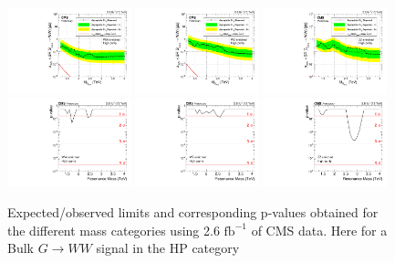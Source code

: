 \begin{figure}[h!]
\centering
\includegraphics[width=0.32\textwidth]{figures/analysis/search1/AN-15-211/limits/brazilianFlag_BulkWW_WWHP_13TeV_wPDF.pdf}
\includegraphics[width=0.32\textwidth]{figures/analysis/search1/AN-15-211/limits/brazilianFlag_BulkWW_WZHP_13TeV_wPDF.pdf}
\includegraphics[width=0.32\textwidth]{figures/analysis/search1/AN-15-211/limits/brazilianFlag_BulkWW_ZZHP_13TeV_wPDF.pdf}\\
\includegraphics[width=0.32\textwidth]{figures/analysis/search1/AN-15-211/pvalues/pvalue_BulkWWinWW_high_purity.pdf}
\includegraphics[width=0.32\textwidth]{figures/analysis/search1/AN-15-211/pvalues/pvalue_BulkWWinWZ_high_purity.pdf}
\includegraphics[width=0.32\textwidth]{figures/analysis/search1/AN-15-211/pvalues/pvalue_BulkWWinZZ_high_purity.pdf}
\caption{Expected/observed limits and corresponding p-values obtained for the different mass categories using 2.6 $\textrm{fb}^{-1}$ of CMS data. Here for a Bulk $G\rightarrow WW$ signal in the HP category}
\label{fig:searchI:Limits_HPBulkWW}
\end{figure}

